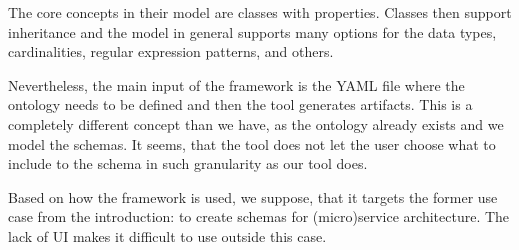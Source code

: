 

The core concepts in their model are classes with properties. Classes then support inheritance and the model in general supports many options for the data types, cardinalities, regular expression patterns, and others.

Nevertheless, the main input of the framework is the YAML file where the ontology needs to be defined and then the tool generates artifacts. This is a completely different concept than we have, as the ontology already exists and we model the schemas. It seems, that the tool does not let the user choose what to include to the schema in such granularity as our tool does.

Based on how the framework is used, we suppose, that it targets the former use case from the introduction: to create schemas for (micro)service architecture. The lack of UI makes it difficult to use outside this case.

